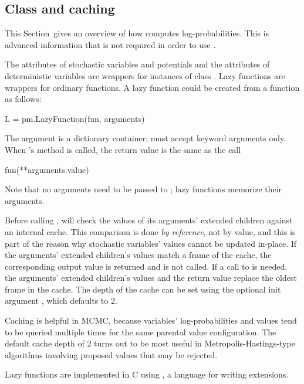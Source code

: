 \documentclass[]{jss}
\begin{document}
\subsection[Class LazyFunction and caching]{Class 
and caching}
\label{sec:caching}
This Section~gives an overview of how  computes log-probabilities. This is advanced information that is not required in order to use .

The  attributes of stochastic variables and potentials and the  attributes of deterministic variables are wrappers for instances of class . Lazy functions are wrappers for ordinary  functions. A lazy function  could be created from a function  as follows:
\begin{CodeInput}
L = pm.LazyFunction(fun, arguments)
\end{CodeInput}
The argument  is a dictionary container;  must accept keyword arguments only. When 's  method is called, the return value is the same as the call
\begin{CodeInput}
fun(**arguments.value)
\end{CodeInput}
Note that no arguments need to be passed to ; lazy functions memorize their arguments.

Before calling ,  will check the values of its arguments' extended children against an internal cache. This comparison is done \emph{by reference}, not by value, and this is part of the reason why stochastic variables' values cannot be updated in-place. If the arguments' extended children's values match a frame of the cache, the corresponding output value is returned and  is not called. If a call to  is needed, the arguments' extended children's values and the return value replace the oldest frame in the cache. The depth of the cache can be set using the optional init argument , which defaults to 2.

Caching is helpful in MCMC, because variables' log-probabilities and values tend to be queried multiple times for the same parental value configuration. The default cache depth of 2 turns out to be most useful in Metropolis-Hastings-type algorithms involving proposed values that may be rejected.

Lazy functions are implemented in C using  \citep{pyrex}, a language for writing  extensions.
\end{document}
